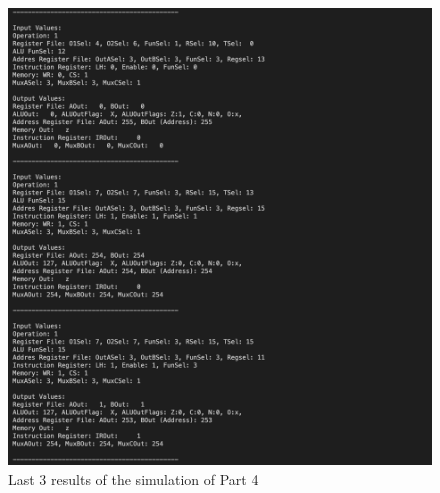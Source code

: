 \documentclass[pdftex,12pt,a4paper]{article}
\begin{document}
\begin{figure}[H]
\centering
\includegraphics[width=1\textwidth]{part4_sim.png}
\caption{Last 3 results of the simulation of Part 4}
\label{fig:part4_sim}
\end{figure}
\end{document}
